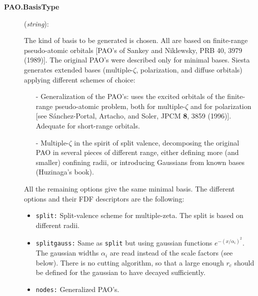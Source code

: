 \documentclass[11pt]{article}
\begin{document}
\begin{description}

\item[{\bf PAO.BasisType}] ({\it string}):

The kind of basis to be generated is chosen. All are based on
finite-range pseudo-atomic orbitals [PAO's of Sankey and Niklewsky, PRB 40, 3979 (1989)]. The
original PAO's were described only for minimal bases. {\sc Siesta}
generates extended bases (multiple-$\zeta$,
polarization, and diffuse
orbitals) applying different schemes of choice:

\begin{itemize}

\item[-] Generalization of the PAO's: uses the excited orbitals of the
finite-range pseudo-atomic problem, both for multiple-$\zeta$ and for
polarization [see S\'anchez-Portal, Artacho, and Soler, JPCM {\bf 8},
3859 (1996)]. Adequate for short-range orbitals.

\item[-] Multiple-$\zeta$ in the spirit of split valence, decomposing the original PAO in several pieces of different
range, either defining more (and smaller) confining radii, or
introducing Gaussians from known bases (Huzinaga's
book).
\end{itemize}

\noindent
All the remaining options
give the same minimal basis.
The different options and their FDF descriptors are the following:

\begin{itemize}

\item {\tt split:} Split-valence scheme for multiple-zeta.
The split is based on different radii.

\item {\tt splitgauss:}
Same as {\tt split} but using gaussian functions
$e^{-(x/\alpha_i)^2}$. The gaussian widths $\alpha_i$ are read instead
of the scale factors (see below). There is no cutting algorithm, so that
a large enough $r_c$ should be defined for the gaussian to have decayed
sufficiently.

\item {\tt nodes:} Generalized PAO's.


\end{itemize}
\end{description}
\end{document}
